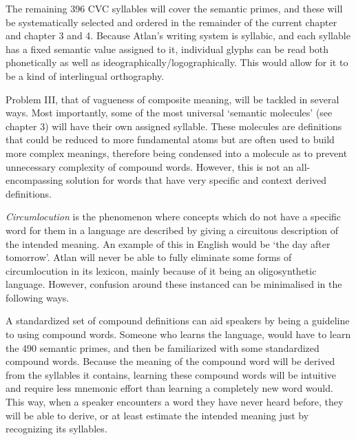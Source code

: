 The remaining 396 CVC syllables will cover the semantic primes, and these will be systematically selected and ordered in the remainder of the current chapter and chapter 3 and 4. Because Atlan’s writing system is syllabic, and each syllable has a fixed semantic value assigned to it, individual glyphs can be read both phonetically as well as ideographically/logographically. This would allow for it to be a kind of interlingual orthography. 

Problem III, that of vagueness of composite meaning, will be tackled in several ways. Most importantly, some of the most universal ‘semantic molecules’ (see chapter 3) will have their own assigned syllable. These molecules are definitions that could be reduced to more fundamental atoms but are often used to build more complex meanings, therefore being condensed into a molecule as to prevent unnecessary complexity of compound words. However, this is not an all-encompassing solution for words that have very specific and context derived definitions. 

{\it Circumlocution} is the phenomenon where concepts which do not have a specific word for them in a language are described by giving a circuitous description of the intended meaning. An example of this in English would be ‘the day after tomorrow’. Atlan will never be able to fully eliminate some forms of circumlocution in its lexicon, mainly because of it being an oligosynthetic language. However, confusion around these instanced can be minimalised in the following ways.  

A standardized set of compound definitions can aid speakers by being a guideline to using compound words. Someone who learns the language, would have to learn the 490 semantic primes, and then be familiarized with some standardized compound words. Because the meaning of the compound word will be derived from the syllables it contains, learning these compound words will be intuitive and require less mnemonic effort than learning a completely new word would. This way, when a speaker encounters a word they have never heard before, they will be able to derive, or at least estimate the intended meaning just by recognizing its syllables.

